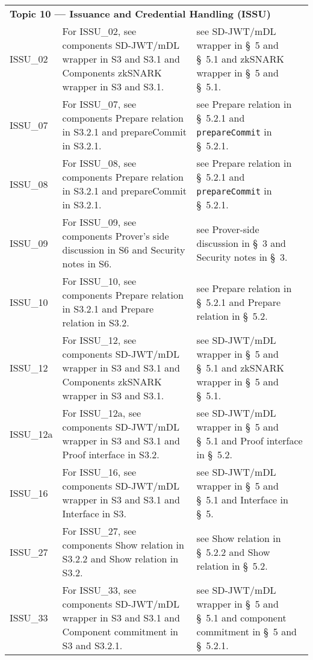 \begin{landscape}
\begin{longtable}{p{3cm} p{10cm} p{7cm}}
\multicolumn{3}{l}{\textbf{Topic 10 — Issuance and Credential Handling (ISSU)}}\\

ISSU\_02 &
For ISSU\_02, see components SD-JWT/mDL wrapper in S3 and S3.1 and Components zkSNARK wrapper in S3 and S3.1. &
see SD-JWT/mDL wrapper in \S~5 and \S~5.1 and zkSNARK wrapper in \S~5 and \S~5.1. \\

ISSU\_07 &
For ISSU\_07, see components Prepare relation in S3.2.1 and prepareCommit in S3.2.1. &
see Prepare relation in \S~5.2.1 and \texttt{prepareCommit} in \S~5.2.1. \\

ISSU\_08 &
For ISSU\_08, see components Prepare relation in S3.2.1 and prepareCommit in S3.2.1. &
see Prepare relation in \S~5.2.1 and \texttt{prepareCommit} in \S~5.2.1. \\

ISSU\_09 &
For ISSU\_09, see components Prover's side discussion in S6 and Security notes in S6. &
see Prover-side discussion in \S~3 and Security notes in \S~3. \\

ISSU\_10 &
For ISSU\_10, see components Prepare relation in S3.2.1 and Prepare relation in S3.2. &
see Prepare relation in \S~5.2.1 and Prepare relation in \S~5.2. \\

ISSU\_12 &
For ISSU\_12, see components SD-JWT/mDL wrapper in S3 and S3.1 and Components zkSNARK wrapper in S3 and S3.1. &
see SD-JWT/mDL wrapper in \S~5 and \S~5.1 and zkSNARK wrapper in \S~5 and \S~5.1. \\

ISSU\_12a &
For ISSU\_12a, see components SD-JWT/mDL wrapper in S3 and S3.1 and Proof interface in S3.2. &
see SD-JWT/mDL wrapper in \S~5 and \S~5.1 and Proof interface in \S~5.2. \\

ISSU\_16 &
For ISSU\_16, see components SD-JWT/mDL wrapper in S3 and S3.1 and Interface in S3. &
see SD-JWT/mDL wrapper in \S~5 and \S~5.1 and Interface in \S~5. \\

ISSU\_27 &
For ISSU\_27, see components Show relation in S3.2.2 and Show relation in S3.2. &
see Show relation in \S~5.2.2 and Show relation in \S~5.2. \\

ISSU\_33 &
For ISSU\_33, see components SD-JWT/mDL wrapper in S3 and S3.1 and Component commitment in S3 and S3.2.1. &
see SD-JWT/mDL wrapper in \S~5 and \S~5.1 and component commitment in \S~5 and \S~5.2.1. \\


\end{longtable}
\end{landscape}
